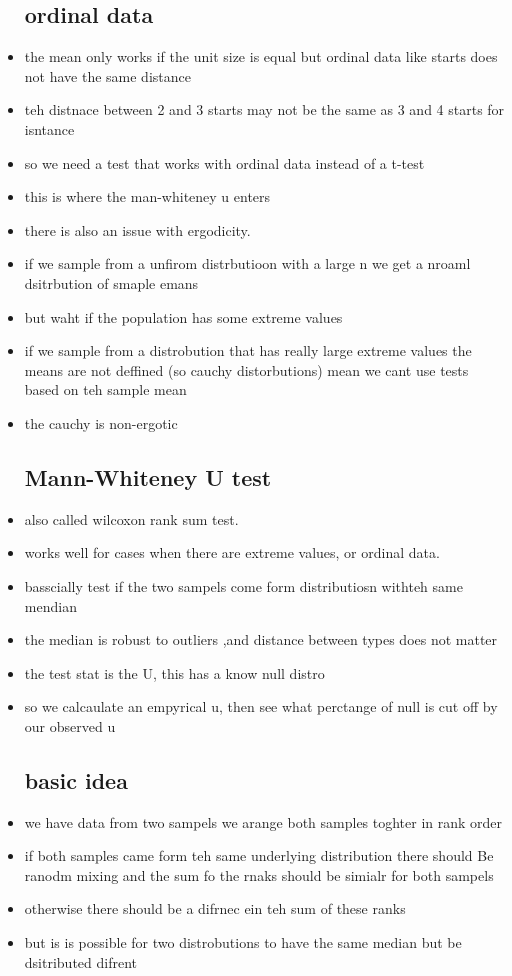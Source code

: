 \documentclass{article}
\begin{document}
\begin{itemize}
\subsection{ordinal data}
\item the mean only works if the unit size is equal but ordinal data like starts does not have the same distance
\item teh distnace between 2 and 3 starts may not be the same as 3 and 4 starts for isntance 
\item so we need a test that works with ordinal data instead of a t-test
\item this is where the man-whiteney u enters 
\item there is also an issue with ergodicity. 
\item if we sample from a unfirom distrbutioon with  a large n we get a nroaml dsitrbution of smaple emans 
\item but waht if the population has some extreme values 
\item if we sample from a distrobution that has really large extreme values the means are not deffined (so cauchy distorbutions) mean we cant use tests based on teh sample mean 
\item the cauchy is non-ergotic
\subsection{Mann-Whiteney U test}
\item also called wilcoxon rank sum test.
\item works well for cases when there are extreme values, or ordinal data. 
\item basscially test if the two sampels come form distributiosn withteh same mendian 
\item the median is robust to outliers ,and distance between types does not matter
\item the test stat is the U, this has a know null distro
\item so we calcaulate an empyrical u, then see what perctange of null is cut off by our observed u 
\subsection{basic idea}
\item we have data from two sampels
\itme we arange both samples toghter in rank order
\item if both samples came form teh same underlying distribution there should Be ranodm mixing and the sum fo the rnaks should be simialr for both sampels
\item otherwise there should be a difrnec ein teh sum of these ranks 
\item but is is possible for two distrobutions to have the same median but be dsitributed difrent 

\end{itemize}
\end{document}
